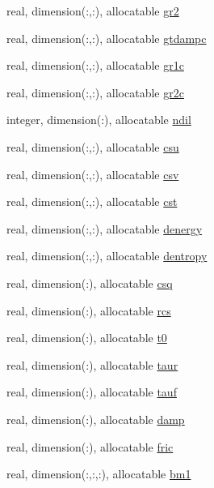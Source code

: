 \begin{DoxyCompactItemize}
\item 
real, dimension(\-:,\-:), allocatable \hyperlink{classpumamod_acb504294dc512bdee020e63fcc43c51c}{gr2}
\item 
real, dimension(\-:,\-:), allocatable \hyperlink{classpumamod_ab154b81faaea8224202d205d5377ecb5}{gtdampc}
\item 
real, dimension(\-:,\-:), allocatable \hyperlink{classpumamod_a3ad097353e5e4017c75dd08d77f374f3}{gr1c}
\item 
real, dimension(\-:,\-:), allocatable \hyperlink{classpumamod_a0063c8f28d68f19195b2154874bb4605}{gr2c}
\item 
integer, dimension(\-:), allocatable \hyperlink{classpumamod_a8cd6f320c3166f241ade820dc3eadb39}{ndil}
\item 
real, dimension(\-:,\-:), allocatable \hyperlink{classpumamod_a9dbdc63a5f305db50a26a47cc34d00c7}{csu}
\item 
real, dimension(\-:,\-:), allocatable \hyperlink{classpumamod_a3ab8cd6714b1bbb4233200b9acba2904}{csv}
\item 
real, dimension(\-:,\-:), allocatable \hyperlink{classpumamod_aec021878423837a34bb3de710083412f}{cst}
\item 
real, dimension(\-:,\-:), allocatable \hyperlink{classpumamod_aeea321b5684fff3240d0367b970bde23}{denergy}
\item 
real, dimension(\-:,\-:), allocatable \hyperlink{classpumamod_a22d2a10d8b9f03d90130b1ccef2ec7c9}{dentropy}
\item 
real, dimension(\-:), allocatable \hyperlink{classpumamod_a4577fee5af720d3d5cee446b6bd36d0c}{csq}
\item 
real, dimension(\-:), allocatable \hyperlink{classpumamod_a121f56c4792fab7bbc57da6a356ba13f}{rcs}
\item 
real, dimension(\-:), allocatable \hyperlink{classpumamod_aa0e5d4127d9cbc662e69de401ab0878f}{t0}
\item 
real, dimension(\-:), allocatable \hyperlink{classpumamod_aa37496e277d03000616cdb2e5b22d7c0}{taur}
\item 
real, dimension(\-:), allocatable \hyperlink{classpumamod_aaddf02e0bb890f2c703effae4cf26a68}{tauf}
\item 
real, dimension(\-:), allocatable \hyperlink{classpumamod_a4c165b031088a68ae36d654a5763aef8}{damp}
\item 
real, dimension(\-:), allocatable \hyperlink{classpumamod_a859085f4ee94ade9cc560157a833370e}{fric}
\item 
real, dimension(\-:,\-:,\-:), allocatable \hyperlink{classpumamod_abc2d5c00d5e5856e8cbc8ed5bee74d11}{bm1}

\end{DoxyCompactItemize}
